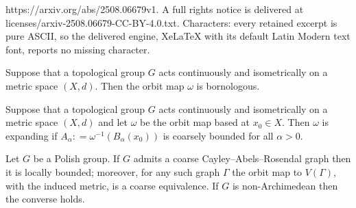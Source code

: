\documentclass[10pt,a4paper]{amsart}
\newcommand{\dfn}{\mathrel{\mathop:}=}
\begin{document}
https://arxiv.org/abs/2508.06679v1. A full rights notice is delivered at licenses/arxiv-2508.06679-CC-BY-4.0.txt. Characters: every retained excerpt is pure ASCII, so the delivered engine, XeLaTeX with its default Latin Modern text font, reports no missing character.
\begin{lemma}\label{lem:cbaction}
  Suppose that a topological group $G$ acts continuously and isometrically 
  on a metric space $(X,d)$. Then the orbit map $\omega$ is
  bornologous.
\end{lemma}

\begin{lemma}\label{lem:expanding_orbit_map}
    Suppose that a topological group $G$
    acts continuously and isometrically on a metric space $(X,d)$
    and let $\omega$ be the orbit map based at $x_0 \in X$.
    Then $\omega$ is expanding if $A_\alpha \dfn \omega^{-1}(B_\alpha(x_0))$
    is coarsely bounded for all $\alpha > 0$. 
\end{lemma}

\begin{proposition}\label{prop:ccar}
 Let $G$ be a Polish group. If $G$ 
 admits a coarse Cayley--Abels--Rosendal graph then it is locally
 bounded; moreover, for
 any such graph $\Gamma$ the orbit map to 
 $V(\Gamma)$, with the induced metric,
 is a coarse equivalence.  
 If $G$ is non-Archimedean then the converse holds.
\end{proposition}
\end{document}
